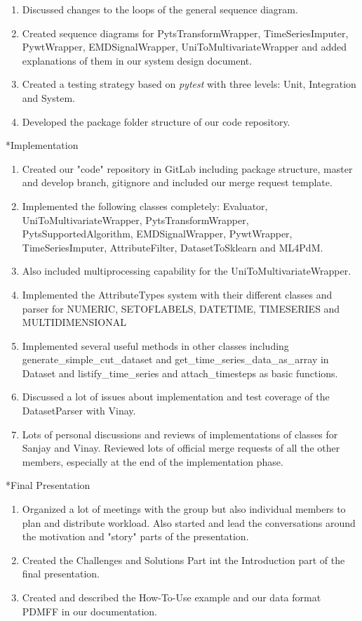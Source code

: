 \documentclass[11pt,a4paper]{article}
\begin{document}
\begin{section}
\begin{subsection}
\begin{enumerate}
			\item Discussed changes to the loops of the general sequence diagram.
			\item Created sequence diagrams for PytsTransformWrapper, TimeSeriesImputer, PywtWrapper, EMDSignalWrapper, UniToMultivariateWrapper and added explanations of them in our system design document.
			\item Created a testing strategy based on \textit{pytest} with three levels: Unit, Integration and System.
			\item Developed the package folder structure of our code repository.
		\end{enumerate}
	\end{subsection}
	\begin{subsection}*{Implementation}
		\begin{enumerate}
			\item Created our "code" repository in GitLab including package structure, master and develop branch, gitignore and included our merge request template.
			\item Implemented the following classes completely: Evaluator, UniToMultivariateWrapper, PytsTransformWrapper, PytsSupportedAlgorithm, EMDSignalWrapper, PywtWrapper, TimeSeriesImputer, AttributeFilter, DatasetToSklearn and ML4PdM.
			\item Also included multiprocessing capability for the UniToMultivariateWrapper.
			\item Implemented the AttributeTypes system with their different classes and parser for NUMERIC, SETOFLABELS, DATETIME, TIMESERIES and MULTIDIMENSIONAL
			\item Implemented several useful methods in other classes including generate\_simple\_cut\_dataset and get\_time\_series\_data\_as\_array in Dataset and listify\_time\_series and attach\_timesteps as basic functions.
			\item Discussed a lot of issues about implementation and test coverage of the DatasetParser with Vinay.
			\item Lots of personal discussions and reviews of implementations of classes for Sanjay and Vinay. Reviewed lots of official merge requests of all the other members, especially at the end of the implementation phase.
		\end{enumerate}
	\end{subsection}
	\begin{subsection}*{Final Presentation}
		\begin{enumerate}
			\item Organized a lot of meetings with the group but also individual members to plan and distribute workload. Also started and lead the conversations around the motivation and "story" parts of the presentation.
			\item Created the Challenges and Solutions Part int the Introduction part of the final presentation.
			\item Created and described the How-To-Use example and our data format PDMFF in our documentation.
		\end{enumerate}
		

\end{subsection}
\end{section}
\end{document}
